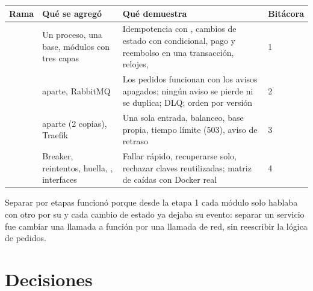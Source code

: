\documentclass[11pt]{article}
\begin{document}
\begin{tabularx}{\linewidth}{@{}l P{3.3cm} Y l@{}}
\toprule
\textsf{\textbf{Rama}} & \textsf{\textbf{Qué se agregó}} & \textsf{\textbf{Qué demuestra}} & \textsf{\textbf{Bitácora}} \\
\midrule
{} & Un proceso, una base, módulos con tres capas & Idempotencia con , cambios de estado con  condicional, pago y reembolso en una transacción, relojes,  & 1 \\
 &  aparte, RabbitMQ & Los pedidos funcionan con los avisos apagados; ningún aviso se pierde ni se duplica; DLQ; orden por versión & 2 \\
 &  aparte (2 copias), Traefik & Una sola entrada, balanceo, base propia, tiempo límite (503), aviso de retraso & 3 \\
 & Breaker, reintentos, huella, , interfaces & Fallar rápido, recuperarse solo, rechazar claves reutilizadas; matriz de caídas con Docker real & 4 \\
\bottomrule
\end{tabularx}

Separar por etapas funcionó porque desde la etapa 1 cada módulo solo hablaba con otro por su
 y cada cambio de estado ya dejaba su evento: separar un servicio fue cambiar una llamada a
función por una llamada de red, sin reescribir la lógica de pedidos.

\section{Decisiones}
\end{document}
